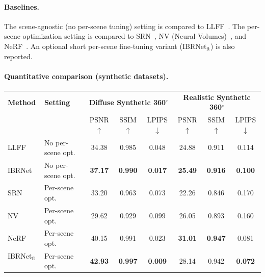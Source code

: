 \begin{enrichment}
\begin{enrichment}
     \paragraph{Baselines.}
     The scene-agnostic (no per-scene tuning) setting is compared to LLFF~\cite{mildenhall2019_llff}. The per-scene optimization setting is compared to SRN~\cite{sitzmann2019_srn}, NV (Neural Volumes)~\cite{lombardi2019_neuralvolumes}, and NeRF~\cite{mildenhall2020_nerf}. An optional short per-scene fine-tuning variant (IBRNet$_\text{ft}$) is also reported.
     
     \paragraph{Quantitative comparison (synthetic datasets).}
     \begin{table}[H]
         \centering
         \footnotesize
         \setlength{\tabcolsep}{4pt} %
         \renewcommand{\arraystretch}{1.1}
         \begin{tabular*}{\linewidth}{@{\extracolsep{\fill}} l|l|ccc|ccc }
             \hline
             \textbf{Method} & \textbf{Setting} &
             \multicolumn{3}{c|}{\textbf{Diffuse Synthetic 360$^\circ$}} &
             \multicolumn{3}{c}{\textbf{Realistic Synthetic 360$^\circ$}} \\
             & & PSNR$\uparrow$ & SSIM$\uparrow$ & LPIPS$\downarrow$
             & PSNR$\uparrow$ & SSIM$\uparrow$ & LPIPS$\downarrow$ \\
             \hline
             LLFF~\cite{mildenhall2019_llff}      & No per-scene opt. & 34.38 & 0.985 & 0.048 & 24.88 & 0.911 & 0.114 \\
             IBRNet~\cite{wang2021_ibrnet}        & No per-scene opt. & \textbf{37.17} & \textbf{0.990} & \textbf{0.017} & \textbf{25.49} & \textbf{0.916} & \textbf{0.100} \\
             \hline
             SRN~\cite{sitzmann2019_srn}          & Per-scene opt.    & 33.20 & 0.963 & 0.073 & 22.26 & 0.846 & 0.170 \\
             NV~\cite{lombardi2019_neuralvolumes} & Per-scene opt.    & 29.62 & 0.929 & 0.099 & 26.05 & 0.893 & 0.160 \\
             NeRF~\cite{mildenhall2020_nerf}      & Per-scene opt.    & 40.15 & 0.991 & 0.023 & \textbf{31.01} & \textbf{0.947} & 0.081 \\
             IBRNet$_\text{ft}$~\cite{wang2021_ibrnet} & Per-scene opt. & \textbf{42.93} & \textbf{0.997} & \textbf{0.009} & 28.14 & 0.942 & \textbf{0.072} \\

\end{tabular*}
\end{table}
\end{enrichment}
\end{enrichment}
